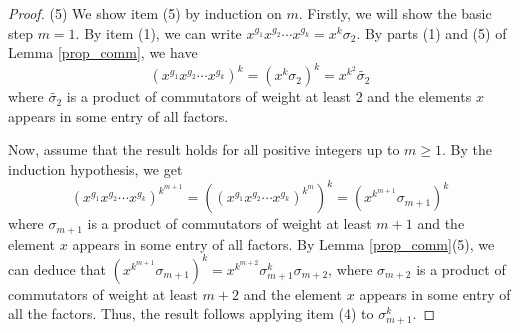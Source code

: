 \documentclass[10pt,a4paper]{amsart}
\begin{document}
\begin{proof}
(5)  We show item (5) by induction on $m$. Firstly, we will show the basic step $m=1$. By item (1), we can write 
$x^{g_1}x^{g_2}\cdots x^{g_k}=x^k\sigma_2$. 
By parts (1) and (5) of Lemma \ref{prop_comm}, we have  
$$(x^{g_1}x^{g_2}\cdots x^{g_k})^k=(x^k\sigma_2)^k=x^{k^2}\tilde{\sigma_2}$$
where $\tilde{\sigma_2}$ is a product of commutators of weight at least 2 and the elements $x$ appears in some entry of all factors.

 Now, assume that the result holds for  all positive integers up to $m\geq 1$. By the induction hypothesis, we  get  
$$(x^{g_1}x^{g_2}\cdots x^{g_k})^{k^{m+1}}=((x^{g_1}x^{g_2}\cdots x^{g_k})^{k^{m}})^k=(x^{k^{m+1}}\sigma_{m+1})^k$$ 
%
where $\sigma_{m+1}$ is a product of commutators of weight at least $m+1$ and the element $x$ appears in some entry of all factors. By Lemma \ref{prop_comm}(5), we can deduce that $(x^{k^{m+1}}\sigma_{m+1})^k=x^{k^{m+2}}\sigma_{m+1}^k\sigma_{m+2}$, where $\sigma_{m+2}$ is a product of commutators of weight at least $m+2$ and the element $x$ appears in some entry of all the factors. Thus, the result follows applying item (4) to $\sigma_{m+1}^k$.
\end{proof}
\end{document}
